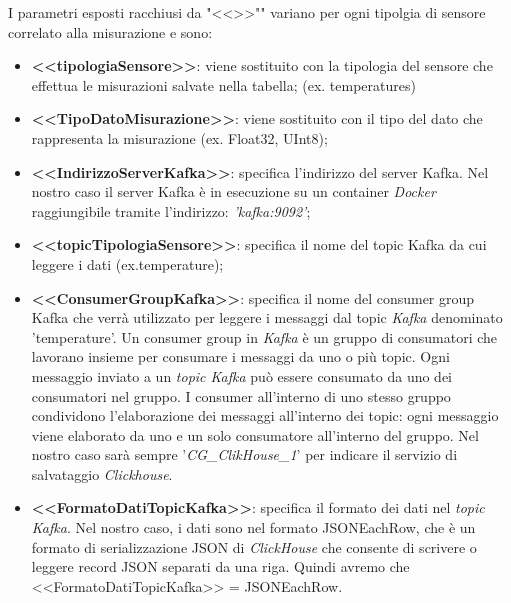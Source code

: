     I parametri esposti racchiusi da "<<>>"" variano per ogni tipolgia di sensore correlato alla misurazione e sono:
    \begin{itemize}
        \item \textbf{<<tipologiaSensore>>}: viene sostituito con la tipologia del sensore che effettua le misurazioni salvate nella tabella; (ex. temperatures)
        \item \textbf{<<TipoDatoMisurazione>>}: viene sostituito con il tipo del dato che rappresenta la misurazione (ex. Float32, UInt8);
        \item \textbf{<<IndirizzoServerKafka>>}: specifica l'indirizzo del server Kafka.
        Nel nostro caso il server Kafka è in esecuzione su un container \textit{Docker} raggiungibile tramite l'indirizzo:
         \textit{'kafka:9092'};
        \item \textbf{<<topicTipologiaSensore>>}: specifica il nome del topic Kafka da cui leggere i dati (ex.temperature);
        \item \textbf{<<ConsumerGroupKafka>>}: specifica il nome del consumer group Kafka che verrà utilizzato per leggere i messaggi dal topic \textit{Kafka} denominato 'temperature'.
        Un consumer group in \textit{Kafka} è un gruppo di consumatori che lavorano insieme per consumare i messaggi da uno o più topic. Ogni messaggio inviato a un \textit{topic Kafka} può essere consumato da uno dei consumatori nel gruppo. I consumer all'interno di uno stesso gruppo condividono l'elaborazione dei messaggi all'interno dei topic: ogni messaggio viene elaborato da uno e un solo consumatore all'interno del gruppo. Nel nostro caso sarà sempre '\textit{CG\_ClikHouse\_1}' per indicare il servizio di salvataggio \textit{Clickhouse}.
        \item \textbf{<<FormatoDatiTopicKafka>>}: specifica il formato dei dati nel \textit{topic Kafka}. Nel nostro caso, i dati sono nel formato JSONEachRow, che è un formato di serializzazione JSON di \textit{ClickHouse} che consente di scrivere o leggere record JSON separati da una riga. Quindi avremo che <<FormatoDatiTopicKafka>> = JSONEachRow.
    \end{itemize}

